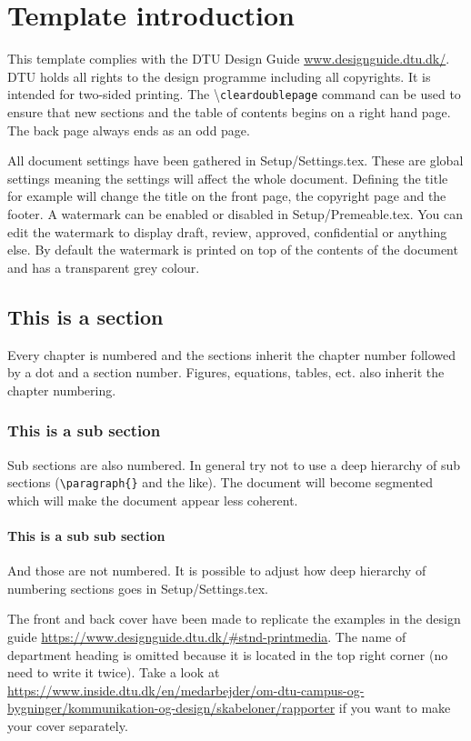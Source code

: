 \chapter{Template introduction}
This template complies with the DTU Design Guide \url{www.designguide.dtu.dk/}. DTU holds all rights to the design programme including all copyrights. It is intended for two-sided printing. The \textbackslash \texttt{cleardoublepage} command can be used to ensure that new sections and the table of contents begins on a right hand page. The back page always ends as an odd page.

All document settings have been gathered in Setup/Settings.tex. These are global settings meaning the settings will affect the whole document. Defining the title for example will change the title on the front page, the copyright page and the footer. A watermark can be enabled or disabled in Setup/Premeable.tex. You can edit the watermark to display draft, review, approved, confidential or anything else. By default the watermark is printed on top of the contents of the document and has a transparent grey colour.

\section{This is a section}
Every chapter is numbered and the sections inherit the chapter number followed by a dot and a section number. Figures, equations, tables, ect. also inherit the chapter numbering.

\subsection{This is a sub section}
Sub sections are also numbered. In general try not to use a deep hierarchy of sub sections (\texttt{\textbackslash paragraph\{\}} and the like). The document will become segmented which will make the document appear less coherent.

\subsubsection{This is a sub sub section}
And those are not numbered. It is possible to adjust how deep hierarchy of numbering sections goes in Setup/Settings.tex.

The front and back cover have been made to replicate the examples in the design guide \url{https://www.designguide.dtu.dk/#stnd-printmedia}. The name of department heading is omitted  because it is located in the top right corner (no need to write it twice). Take a look at \url{https://www.inside.dtu.dk/en/medarbejder/om-dtu-campus-og-bygninger/kommunikation-og-design/skabeloner/rapporter} if you want to make your cover separately.

